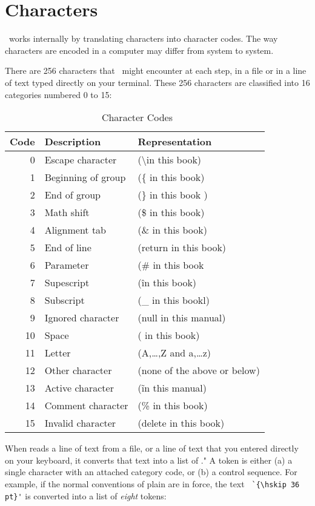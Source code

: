 \chapter{Characters}

\normalsize

\tex\ works internally by translating characters into character codes. The way characters are encoded in a computer
may differ from system to system.


There are 256 characters that \tex\  might encounter at
each step, in a file or in a line of text typed directly on your terminal. These
256 characters are classified into 16 categories numbered 0 to 15:

\begin{table}[htbp]
\begin{tabular}{rll}
\toprule
Code & Description & Representation\\
\midrule
0 &  Escape character & (\textbackslash in this book)\\
1 & Beginning of group & (\{ in this book)\\
2 & End of group & (\} in this book )\\
3 & Math shift & (\$ in this book)\\
4 & Alignment tab & (\& in this book)\\
5 & End of line &(return in this book)\\
6 & Parameter &(\# in this book\\
7 & Supescript &(\^ in this book)\\
8 & Subscript &(\_ in this bookl)\\
9 & Ignored character &(null in this manual)\\
10 & Space &(\char32 in this book)\\
11 &Letter &(A,\ldots,Z and a,\ldots z)\\
12 &Other character &(none of the above or below)\\
13 &Active character &(\~ in this manual)\\
14 &Comment character &(\% in this book)\\
15 &Invalid character &(delete in this book)\\
\bottomrule
\end{tabular}
\caption{\tex\ Character Codes}
\end{table}
\medskip

When \tex reads a line of text from a file, or a line of text that you entered
directly on your keyboard, it converts that text into a list of \cmd{\tokens}." A
token is either (a) a single character with an attached category code, or (b) a control
sequence. For example, if the normal conventions of plain \tex  are in force, the text
\verb*+ `{\hskip 36 pt}'+  is converted into a list of \textit{eight} tokens:
\medskip

